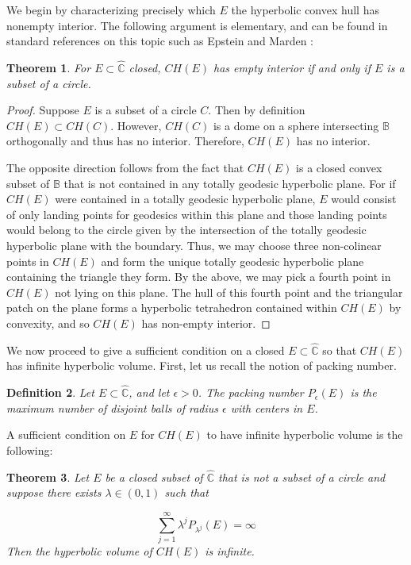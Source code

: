 \documentclass[11pt]{article}
\newtheorem{tm}{Theorem}[section]
\newtheorem{defi}[tm]{Definition}
\newcommand\comp{{\mathbb{C}}}
\newcommand\ball{{\mathbb{B}}}
\begin{document}
    
 We begin by characterizing precisely which $E$ the hyperbolic convex hull has nonempty interior. The following argument is elementary, and can be found in standard references on this topic such as Epstein and Marden \cite{epst}: 
    
    \begin{tm}
        For $E \subset \hat{\comp}$ closed, $CH(E)$ has empty interior if and only if $E$ is a subset of a circle. 
    \end{tm}


   \begin{proof}
       Suppose $E$ is a subset of a circle $C$. Then by definition $CH(E) \subset CH(C)$. However, $CH(C)$ is a dome on a sphere intersecting $\ball$ orthogonally and thus has no interior. Therefore, $CH(E)$ has no interior. 
   \bigskip

   
   The opposite direction follows from the fact that $CH(E)$ is a closed convex subset of $\ball$ that is not contained in any totally geodesic hyperbolic plane. For if $CH(E)$ were contained in a totally geodesic hyperbolic plane, $E$ would consist of only landing points for geodesics within this plane and those landing points would belong to the circle given by the intersection of the totally geodesic hyperbolic plane with the boundary. Thus, we may choose three non-colinear points in $CH(E)$ and form the unique totally geodesic hyperbolic plane containing the triangle they form. By the above, we may pick a fourth point in $CH(E)$ not lying on this plane. The hull of this fourth point and the triangular patch on the plane forms a hyperbolic tetrahedron contained within $CH(E)$ by convexity, and so $CH(E)$ has non-empty interior.        
   \end{proof} 

   \bigskip

    We now proceed to give a sufficient condition on a closed $E \subset \hat{\comp}$ so that $CH(E)$ has infinite hyperbolic volume. First, let us recall the notion of packing number. 

    \begin{defi}
        Let $E \subset \hat{\comp}$, and let $\epsilon > 0$. The packing number $P_\epsilon(E)$ is the maximum number of disjoint balls of radius $\epsilon$ with centers in $E$. 
    \end{defi}

    A sufficient condition on $E$ for $CH(E)$ to have infinite hyperbolic volume is the following:

    \begin{tm}
        Let $E$ be a closed subset of $\hat{\comp}$ that is not a subset of a circle and suppose there exists $\lambda \in (0,1)$ such that 

        \begin{equation}
            \sum_{j=1}^\infty \lambda^j P_{\lambda^j}(E) = \infty 
        \end{equation} Then the hyperbolic volume of $CH(E)$ is infinite. 
    \end{tm}
\end{document}
